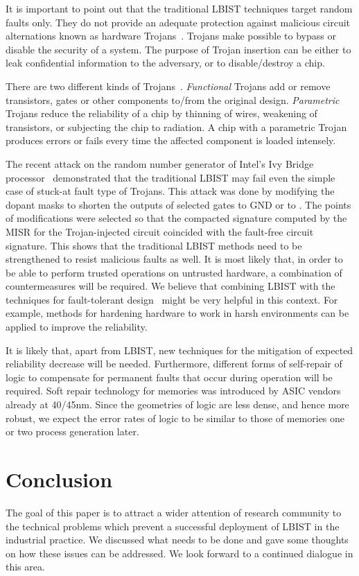 \documentclass[conference]{IEEEtran}
\begin{document}
It is important to point out that the traditional LBIST techniques target random faults only. 
They do not provide an adequate protection against malicious circuit alternations known as hardware Trojans~\cite{TeK10}. Trojans make possible to bypass or disable the security of a system. The purpose of Trojan insertion can be either to leak confidential information to the adversary, or to disable/destroy a chip. 

There are two different kinds of Trojans~\cite{TeK10}. 
{\em Functional} Trojans add or remove transistors, gates or other components to/from the original design.
{\em Parametric} Trojans reduce the reliability of a chip by thinning of wires, weakening of transistors, or subjecting the chip to radiation. A chip with a parametric Trojan produces errors or fails every time the affected component is loaded intensely.
 
The recent attack on the random number generator of Intel's Ivy Bridge processor~\cite{BeRPB13} demonstrated that the traditional LBIST
may fail even the simple case of stuck-at fault type of Trojans.
This attack was done by modifying the dopant masks to shorten the outputs of selected gates to GND or to . The points of modifications were selected so that the compacted signature computed by the MISR for the Trojan-injected circuit coincided with the fault-free circuit signature.  This shows that the traditional LBIST methods need to be strengthened to resist malicious faults as well. 
It is most likely that, in order to be able to perform trusted operations on untrusted hardware, a combination of countermeasures will be required. 
We believe that combining LBIST with the techniques for fault-tolerant design~\cite{Du13book} might be very helpful in this context.
For example, methods for hardening hardware to work in harsh environments can be applied to improve the reliability.

It is likely that, apart from LBIST, new techniques for the mitigation of expected reliability decrease
will be needed. Furthermore, different forms of self-repair of logic to compensate for permanent 
faults that occur during operation will be required. Soft repair technology for memories was introduced by ASIC vendors already at 40/45nm.
Since the geometries of logic are less dense, and hence 
more robust, we expect the error rates of logic to be similar to those of memories one or two process 
generation later.

\section{Conclusion} \label{con}
 
The goal of this paper is to attract a wider attention of research community to the technical 
problems which prevent a successful deployment of LBIST in the industrial practice.
We discussed what needs to be done and gave some thoughts on how these issues can be addressed.
We look forward to a continued dialogue in this area.



\balance


\end{document}
